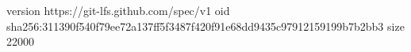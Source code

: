 version https://git-lfs.github.com/spec/v1
oid sha256:311390f540f79ee72a137ff5f3487f420f91e68dd9435c97912159199b7b2bb3
size 22000
